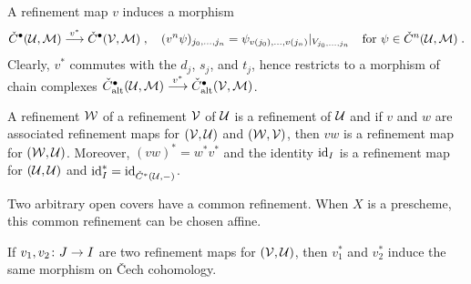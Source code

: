 \documentclass[a4paper,parskip=half,numbers=enddot, DIV=12]{scrreprt}
\newcommand{\vC}{\v{C}}
\begin{document}
A refinement map $v$ induces a morphism
\begin{align*}
	\check{C}^\bullet (\Uu,\Mm)\morphism[v^*]\check{C}^\bullet (\Vv,\Mm)\;,\quad(v^n\psi)_{j_0,\ldots,j_n}=\psi_{v(j_0),\ldots,v(j_n)}|_{V_{j_0,\ldots,j_n}}\quad\text{for }\psi\in\check{C}^n(\Uu,\Mm)\;.
\end{align*}
Clearly, $v^*$ commutes with the $d_j$, $s_j$, and $t_j$, hence restricts to a morphism of chain complexes $\check{C}_\alt^\bullet (\Uu,\Mm)\morphism[v^*]\check{C}_\alt^\bullet (\Vv,\Mm)$.
\begin{lem}
	\begin{alphanumerate}
		\item {}A refinement $\mathcal{W}$ of a refinement $\mathcal{V}$ of $\mathcal{U}$ is a refinement of $\mathcal{U}$ and if $v$ and $w$ are associated refinement maps for $(\mathcal{V},\mathcal{U})$ and $(\mathcal{W},\mathcal{V})$, then $vw$ is a refinement map for $(\mathcal{W},\mathcal{U})$. Moreover, $(vw)^*=w^*v^*$ and the identity $\operatorname{id}_I$ is a refinement map for $(\mathcal{U},\mathcal{U})$ and $\operatorname{id}_I^*=\operatorname{id}_{\check{C}^*(\mathcal{U},-)}$.
		\item Two arbitrary open covers have a common refinement. When $X$ is a prescheme, this common refinement can be chosen affine.
		\item If $v_1,v_2\colon J\morphism I$ are two refinement maps for $(\mathcal{V},\mathcal{U})$, then $v_1^*$ and $v_2^*$ induce the same morphism on \vC ech cohomology.
	\end{alphanumerate}
\end{lem}
\end{document}
